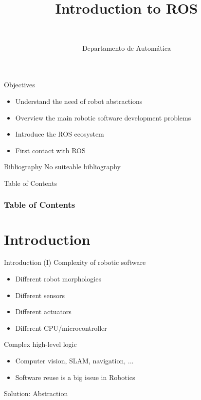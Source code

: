 \documentclass[10pt,compress]{beamer} %
\title[Introduction to ROS]{Introduction to ROS}
\author{\asignatura\\\carrera}
\institute{}
\date{Departamento de Automática}
\begin{document}
{\titlepageBlue
    \begin{frame}
        \titlepage
    \end{frame}
}

\institute{\asignatura}

\begin{frame}[plain]{}
   \begin{block}{Objectives}
       \begin{itemize}
        \item Understand the need of robot abstractions
        \item Overview the main robotic software development problems
        \item Introduce the ROS ecosystem
        \item First contact with ROS
       \end{itemize}
   \end{block}

   \begin{block}{Bibliography}
       No suiteable bibliography
   \end{block}
\end{frame}

{
\begin{frame}[shrink]{Table of Contents}
 \frametitle{Table of Contents}
 \tableofcontents
\end{frame}
}

\section{Introduction}

\begin{frame}{Introduction (I)}
	Complexity of robotic software
	\begin{itemize}
		\item Different robot morphologies
		\item Different sensors
		\item Different actuators
		\item Different CPU/microcontroller
  	\end{itemize}
	Complex high-level logic
	\begin{itemize}
		\item Computer vision, SLAM, navigation, ...
		\item Software reuse is a big issue in Robotics
	\end{itemize}
	Solution: Abstraction
\end{frame}
\end{document}
